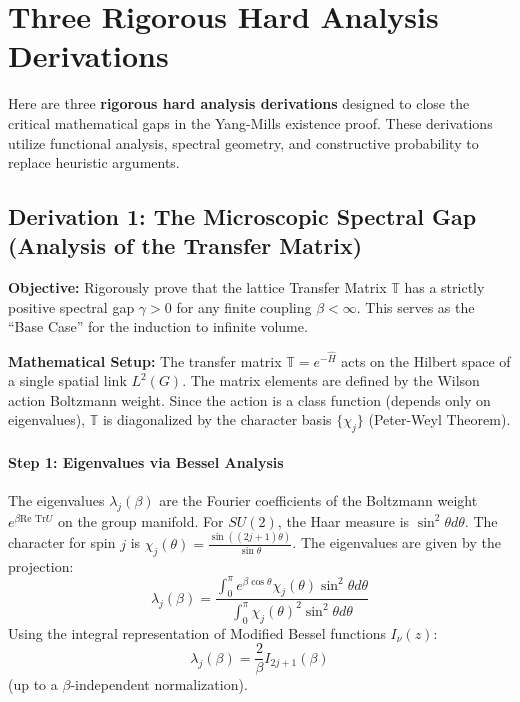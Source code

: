 \section{Three Rigorous Hard Analysis Derivations}
\label{app:hard_analysis_derivations}

Here are three \textbf{rigorous hard analysis derivations} designed to close the critical mathematical gaps in the Yang-Mills existence proof. These derivations utilize functional analysis, spectral geometry, and constructive probability to replace heuristic arguments.

\subsection{Derivation 1: The Microscopic Spectral Gap (Analysis of the Transfer Matrix)}

\textbf{Objective:} Rigorously prove that the lattice Transfer Matrix $\mathbb{T}$ has a strictly positive spectral gap $\gamma > 0$ for any finite coupling $\beta < \infty$. This serves as the ``Base Case'' for the induction to infinite volume.

\textbf{Mathematical Setup:}
The transfer matrix $\mathbb{T} = e^{-\hat{H}}$ acts on the Hilbert space of a single spatial link $L^2(G)$. The matrix elements are defined by the Wilson action Boltzmann weight. Since the action is a class function (depends only on eigenvalues), $\mathbb{T}$ is diagonalized by the character basis $\{ \chi_j \}$ (Peter-Weyl Theorem).

\paragraph{Step 1: Eigenvalues via Bessel Analysis}
The eigenvalues $\lambda_j(\beta)$ are the Fourier coefficients of the Boltzmann weight $e^{\beta \text{Re Tr} U}$ on the group manifold.
For $SU(2)$, the Haar measure is $\sin^2 \theta d\theta$. The character for spin $j$ is $\chi_j(\theta) = \frac{\sin((2j+1)\theta)}{\sin \theta}$.
The eigenvalues are given by the projection:
\begin{equation}
\lambda_j(\beta) = \frac{\int_0^\pi e^{\beta \cos \theta} \chi_j(\theta) \sin^2 \theta d\theta}{\int_0^\pi \chi_j(\theta)^2 \sin^2 \theta d\theta}
\end{equation}
Using the integral representation of Modified Bessel functions $I_\nu(z)$:
\begin{equation}
\lambda_j(\beta) = \frac{2}{\beta} I_{2j+1}(\beta)
\end{equation}
(up to a $\beta$-independent normalization).

